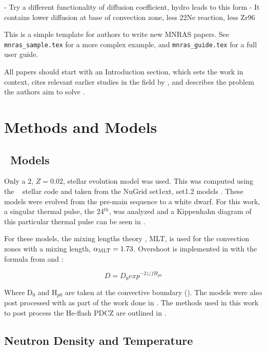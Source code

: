 \documentclass[fleqn,usenatbib]{mnras}
\begin{document}
- Try a different functionality of diffusion coefficient, hydro leads to this form
- It contains lower diffusion at base of convection zone, less 22Ne reaction, less Zr96

This is a simple template for authors to write new MNRAS papers.
See \texttt{mnras\_sample.tex} for a more complex example, and \texttt{mnras\_guide.tex}
for a full user guide.

All papers should start with an Introduction section, which sets the work
in context, cites relevant earlier studies in the field by \citet{1996ApJ...456..902R},
and describes the problem the authors aim to solve \citep[e.g.][]{cyburt:10}.


\section{Methods and Models}

\subsection{\MESA~Models}
\label{sec:mesa_models} %

Only a 2\Msun, $Z=0.02$, stellar evolution model was used. This was computed using the \MESA~\citep{mesa} stellar code and taken from the \nugrid NuGrid set1ext, set1.2 models \citep{models}. These models were evolved from the pre-main sequence to a white dwarf. For this work, a singular thermal pulse, the 24$^{th}$, was analyzed and a Kippenhahn diagram of this particular thermal pulse can be seen in . 

For these models, the mixing lengths theory \citep{cox}, MLT, is used for the convection zones with a mixing length, $\alpha_{\mathrm{MLT}}=1.73$. Overshoot is implemented in \MESA with the formula from \citet{overshoot} and \citet{freytag}:

\begin{equation}
D = D_{0} exp^{-2z/f H_{p0}}
\label{eq:overshoot}
\end{equation} 

\noindent Where D$_{0}$ and H$_{p0}$ are taken at the convective boundary (). The models were also post processed with \mppnp as part of the work done in \citep{models}. The methods used in this work to post process the He-flash PDCZ are outlined in .

\subsection{Neutron Density and Temperature}
\label{sec:neutron}
\end{document}
